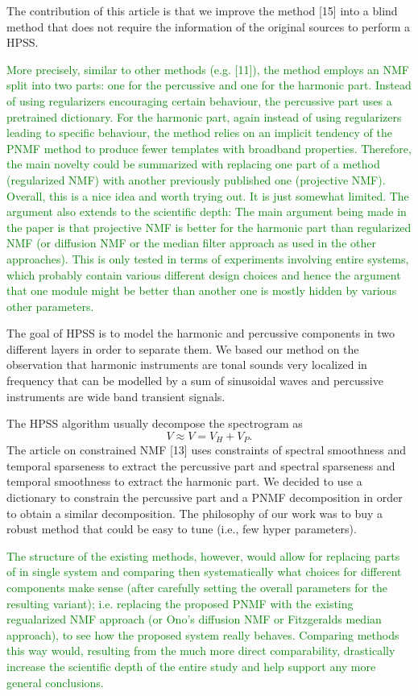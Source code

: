 \documentclass[]{article}
\begin{document}
The contribution of this article is that we improve the method [15] into a blind method that does not require the information of the original sources to perform a HPSS.



\textcolor{green}{More precisely, similar to other methods (e.g. [11]), the method employs an NMF split into two parts: one for the percussive and one for the harmonic part. Instead of using regularizers encouraging certain behaviour, the percussive part uses a pretrained dictionary. For the harmonic part, again instead of using regularizers leading to specific behaviour, the method relies on an implicit tendency of the PNMF method to produce fewer templates with broadband properties. Therefore, the main novelty could be summarized with replacing one part of a method (regularized NMF) with another previously published one (projective NMF). Overall, this is a nice idea and worth trying out. It is just somewhat limited.
The argument also extends to the scientific depth: The main argument being made in the paper is that projective NMF is better for the harmonic part than regularized NMF (or diffusion NMF or the median filter approach as used in the other approaches). This is only tested in terms of experiments involving entire systems, which probably contain various different design choices and hence the argument that one module might be better than another one is mostly hidden by various other parameters.}

The goal of HPSS is to model the harmonic and percussive components in two different layers in order to separate them. We based our method on the observation that harmonic instruments are tonal sounds very localized in frequency that can be modelled by a sum of sinusoidal waves and percussive instruments are wide band transient signals.

The HPSS algorithm usually decompose the spectrogram as 
$$
V \approx V = V_H + V_P.
$$
The article on constrained NMF [13] uses constraints of spectral smoothness and temporal sparseness to extract the percussive part and spectral sparseness and temporal smoothness to extract the harmonic part. 
We decided to use a dictionary to constrain the percussive part and a PNMF decomposition in order to obtain a similar decomposition. The philosophy of our work was to buy a robust method that could be easy to tune (i.e., few hyper parameters).


\textcolor{green}{The structure of the existing methods, however, would allow for replacing parts of in single system and comparing then systematically what choices for different components make sense (after carefully setting the overall parameters for the resulting variant); i.e. replacing the proposed PNMF with the existing regualarized NMF approach (or Ono's diffusion NMF or Fitzgeralds median approach), to see how the proposed system really behaves.  Comparing methods this way would, resulting from the much more direct comparability, drastically increase the scientific depth of the entire study and help support any more general conclusions.}
\end{document}
